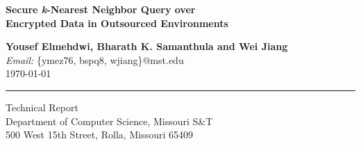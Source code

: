 \documentclass{article}
\begin{document}
\begin{center}
\vspace*{5cm}
{\huge\bf\sf Secure {\em k}-Nearest Neighbor Query over\\ Encrypted Data in Outsourced Environments}\\
\vspace{3cm}

{\Large\bf\sf Yousef Elmehdwi, Bharath K. Samanthula and Wei Jiang}\\


{\large\sf \emph{Email:} \{ymez76, bspq8, wjiang\}@mst.edu}\\

\vspace{3cm}
{\Large\sf \today}\\ \vspace{1cm}
\hrule
\begin{center}
{\large\sf Technical Report \\
Department of Computer Science, Missouri S\&T\\
500 West 15th Street, Rolla, Missouri 65409}\\
\end{center}

\begin{comment}
\begin{figure}[!h]
\centering
\epsfig{file=logo-new, width= .3\textwidth}
\label{fig: logo}
\end{figure}
\end{comment}
\end{center}

\title{}
\author{}



\date{}
\maketitle
\end{document}

